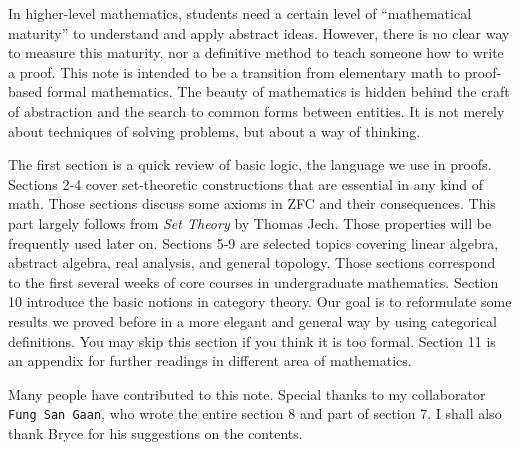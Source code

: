 \documentclass[10pt]{article}
\begin{document}
\hstart
\par
In higher-level mathematics, students need a certain level of ``mathematical maturity'' to understand and apply abstract ideas. However, there is no clear way to measure this maturity, nor a definitive method to teach someone how to write a proof. This note is intended to be a transition from elementary math to proof-based formal mathematics. The beauty of mathematics is hidden behind the craft of abstraction and  the search to common forms between entities. It is not merely about techniques of solving problems, but about a way of thinking.
\par
The first section is a quick review of basic logic, the language we use in proofs. Sections 2-4 cover set-theoretic constructions that are essential in any kind of math. Those sections discuss some axioms in ZFC and their consequences. This part largely follows from \textit{Set Theory} by Thomas Jech. Those properties will be frequently used later on. Sections 5-9 are selected topics covering linear algebra, abstract algebra, real analysis, and general topology. Those sections correspond to the first several weeks of core courses in undergraduate mathematics. Section 10 introduce the basic notions in category theory. Our goal is to reformulate some results we proved before in a more elegant and general way by using categorical definitions. You may skip this section if you think it is too formal. Section 11 is an appendix for further readings in different area of mathematics. 
\par
Many people have contributed to this note. Special thanks to my collaborator \texttt{Fung San Gaan}, who wrote the entire section 8 and part of section 7. I shall also thank Bryce for his suggestions on the contents.
\end{document}
